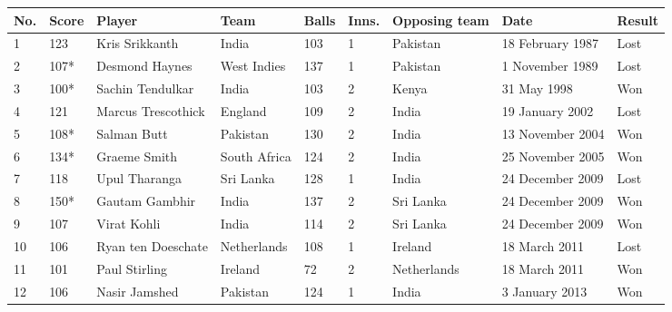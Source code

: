 \documentclass{article}
\begin{document}
\begin{tabular}{lllllllll}
\toprule
No. & Score & Player & Team & Balls & Inns. & Opposing team & Date & Result \\
\midrule
1 & 123 & Kris Srikkanth & India & 103 & 1 & Pakistan & 18 February 1987 & Lost \\
2 & 107* & Desmond Haynes & West Indies & 137 & 1 & Pakistan & 1 November 1989 & Lost \\
3 & 100* & Sachin Tendulkar & India & 103 & 2 & Kenya & 31 May 1998 & Won \\
4 & 121 & Marcus Trescothick & England & 109 & 2 & India & 19 January 2002 & Lost \\
5 & 108* & Salman Butt & Pakistan & 130 & 2 & India & 13 November 2004 & Won \\
6 & 134* & Graeme Smith & South Africa & 124 & 2 & India & 25 November 2005 & Won \\
7 & 118 & Upul Tharanga & Sri Lanka & 128 & 1 & India & 24 December 2009 & Lost \\
8 & 150* & Gautam Gambhir & India & 137 & 2 & Sri Lanka & 24 December 2009 & Won \\
9 & 107 & Virat Kohli & India & 114 & 2 & Sri Lanka & 24 December 2009 & Won \\
10 & 106 & Ryan ten Doeschate & Netherlands & 108 & 1 & Ireland & 18 March 2011 & Lost \\
11 & 101 & Paul Stirling & Ireland & 72 & 2 & Netherlands & 18 March 2011 & Won \\
12 & 106 & Nasir Jamshed & Pakistan & 124 & 1 & India & 3 January 2013 & Won \\
\bottomrule
\end{tabular}
\end{document}
